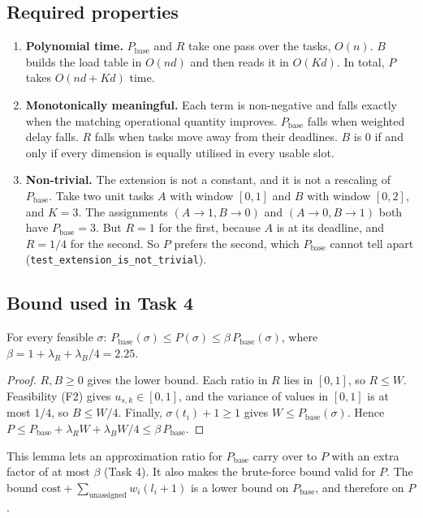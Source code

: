 \subsection{Required properties}
\begin{enumerate}
\item \textbf{Polynomial time.} $P_{\text{base}}$ and $R$ take one pass over
  the tasks, $O(n)$. $B$ builds the load table in $O(nd)$ and then reads it
  in $O(Kd)$. In total, $P$ takes $O(nd + Kd)$ time.
\item \textbf{Monotonically meaningful.} Each term is non-negative and falls
  exactly when the matching operational quantity improves. $P_{\text{base}}$
  falls when weighted delay falls. $R$ falls when tasks move away from their
  deadlines. $B$ is 0 if and only if every dimension is equally utilised in
  every usable slot.
\item \textbf{Non-trivial.} The extension is not a constant, and it is not a
  rescaling of $P_{\text{base}}$. Take two unit tasks $A$ with window $[0,1]$
  and $B$ with window $[0,2]$, and $K=3$. The assignments $(A{\to}1, B{\to}0)$
  and $(A{\to}0, B{\to}1)$ both have $P_{\text{base}} = 3$. But $R = 1$ for
  the first, because $A$ is at its deadline, and $R = 1/4$ for the second. So
  $P$ prefers the second, which $P_{\text{base}}$ cannot tell apart
  (\texttt{test\_extension\_is\_not\_trivial}).
\end{enumerate}

\subsection{Bound used in Task 4}
\begin{lemma}\label{lem:sandwich}
For every feasible $\sigma$:
$P_{\text{base}}(\sigma) \le P(\sigma) \le \beta\, P_{\text{base}}(\sigma)$, where
$\beta = 1 + \lambda_R + \lambda_B/4 = 2.25$.
\end{lemma}
\begin{proof}
$R,B \ge 0$ gives the lower bound. Each ratio in $R$ lies in $[0,1]$, so
$R \le W$. Feasibility (F2) gives $u_{s,k}\in[0,1]$, and the variance of
values in $[0,1]$ is at most $1/4$, so $B \le W/4$. Finally,
$\sigma(t_i)+1\ge 1$ gives $W \le P_{\text{base}}(\sigma)$. Hence
$P \le P_{\text{base}} + \lambda_R W + \lambda_B W/4 \le \beta\,P_{\text{base}}$.
\end{proof}
This lemma lets an approximation ratio for $P_{\text{base}}$ carry over to
$P$ with an extra factor of at most $\beta$ (Task 4). It also makes the
brute-force bound valid for $P$. The bound
$\text{cost} + \sum_{\text{unassigned}} w_i(l_i+1)$ is a lower bound on
$P_{\text{base}}$, and therefore on $P$.


